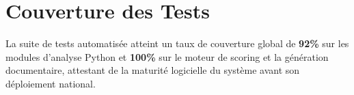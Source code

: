\section{Couverture des Tests}
La suite de tests automatisée atteint un taux de couverture global de \textbf{92\%} sur les modules d'analyse Python et \textbf{100\%} sur le moteur de scoring et la génération documentaire, attestant de la maturité logicielle du système avant son déploiement national.
